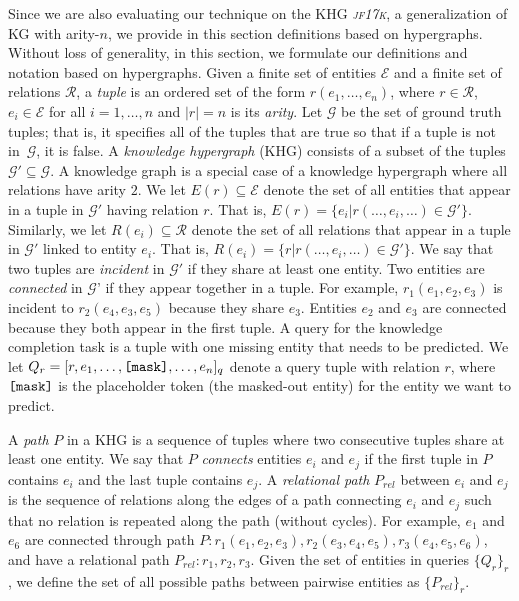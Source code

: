 \documentclass{article}
\newcommand{\jf}{\textsl{\textsc{jf17k}}\xspace}
\newcommand{\mask}{\mbox{\texttt{[mask]}}}
\newcommand{\set}[1]{\ensuremath{\mathcal{#1}}}
\newcommand{\relset}[0]{{\set{R}}}
\newcommand{\entset}[0]{{\set{E}}}
\newcommand{\kg}[0]{{\set{G}}}
\begin{document}
Since we are also evaluating our technique on the KHG \jf, a generalization of KG with arity-$n$, we provide in this section definitions based on hypergraphs. 
Without loss of generality, in this section, we formulate our definitions and notation based on hypergraphs. 
Given a finite set of entities $\entset$ and a finite set of relations $\relset$, a
\emph{tuple} is an ordered set of the form $r(e_1, \dots, e_n)$, where $r \in \relset$, $e_i \in \entset$ for all $i=1,\dots,n$ and $|r| = n$ is its \emph{arity}. 
Let $\kg$ be the set of ground truth tuples; that is, it specifies all of the tuples that are true so that if a tuple is not in~\kg, it is false.
A \emph{knowledge hypergraph} (KHG) consists of a subset of the tuples $\mathcal{G'} \subseteq \kg$.
A knowledge graph is a special case of a knowledge hypergraph where all relations have arity $2$. 
We let $E(r) \subseteq \entset$ denote the set of all entities that appear in a tuple in $\kg'$ having relation $r$. 
That is, $E(r) = \{e_i | r(\dots, e_i, \dots) \in \kg'\}$.
Similarly, we let $R(e_i) \subseteq \relset$ denote the set of all relations that appear in a tuple in $\kg'$ linked to entity $e_i$. 
That is, $R(e_i) = \{r | r(\dots, e_i, \dots) \in \kg'\}$.
We say that two tuples are \emph{incident} in $\kg'$ if they share at least one entity. 
Two entities are \emph{connected} in \kg' if they appear together in a tuple.
For example, $r_1(e_1, e_2, e_3)$ is incident to $r_2(e_4, e_3, e_5)$ because they share $e_3$. 
Entities  $e_2$ and $e_3$ are connected because they both appear in the first tuple. 
A query for the knowledge completion task is a tuple with one missing entity that needs to be predicted. 
We let $Q_r = [r, e_1, \dots, \mask, \dots, e_n]_q$ denote a query tuple with relation $r$, where $\mask{}$ is the placeholder token (the masked-out entity) for the entity we want to predict.

A \emph{path} $P$ in a KHG is a sequence of tuples where two consecutive tuples share at least one entity.  
We say that $P$ \emph{connects} entities $e_i$ and $e_j$ if the first tuple in $P$ contains $e_i$ and the last tuple contains $e_j$. 
A \emph{relational path} $P_{rel}$ between $e_i$ and $e_j$ is the sequence of relations along the edges of a path connecting $e_i$ and $e_j$ such that no relation is repeated along the path (without cycles).
For example, $e_1$ and $e_6$ are connected through path $P: r_1(e_1,e_2, e_3), r_2(e_3,e_4, e_5), r_3(e_4,e_5, e_6)$, and have a relational path $P_{rel}: r_1, r_2, r_3$. Given the set of entities in queries $\{Q_r\}_r$, we define the set of all possible paths between pairwise entities as $\{P_{rel}\}_{r}$.
\end{document}
